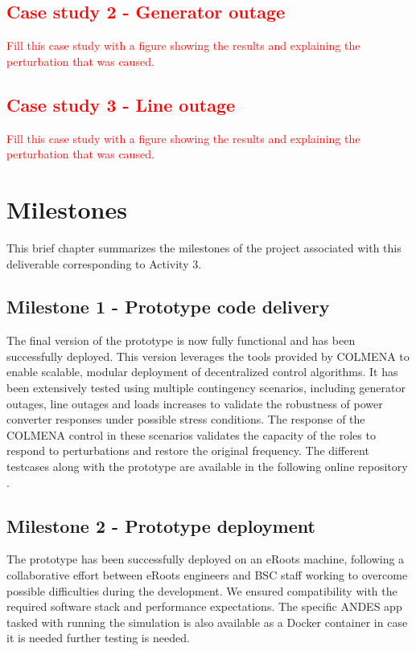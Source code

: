 \documentclass{article}
\begin{document}
\subsection{\textcolor{red}{Case study 2 - Generator outage}}
\textcolor{red}{Fill this case study with a figure showing the results and explaining the perturbation that was caused.}

\subsection{\textcolor{red}{Case study 3 - Line outage}}
\textcolor{red}{Fill this case study with a figure showing the results and explaining the perturbation that was caused.}

\newpage
\section{Milestones}
This brief chapter summarizes the milestones of the project associated with this deliverable corresponding to Activity 3.

\subsection*{Milestone 1 - Prototype code delivery}

The final version of the prototype is now fully functional and has been successfully deployed. This version leverages the tools provided by COLMENA to enable scalable, modular deployment of decentralized control algorithms. It has been extensively tested using multiple contingency scenarios, including generator outages, line outages and loads increases to validate the robustness of power converter responses under possible stress conditions. The response of the COLMENA control in these scenarios validates the capacity of the roles to respond to perturbations and restore the original frequency. The different testcases along with the prototype are available in the following online repository \cite{repo:colmenaeroots}.

\subsection*{Milestone 2 - Prototype deployment}

The prototype has been successfully deployed on an eRoots machine, following a collaborative effort between eRoots engineers and BSC staff working to overcome possible difficulties during the development. We ensured compatibility with the required software stack and performance expectations. The specific ANDES app tasked with running the simulation is also available as a Docker container in case it is needed further testing is needed. 
\end{document}
